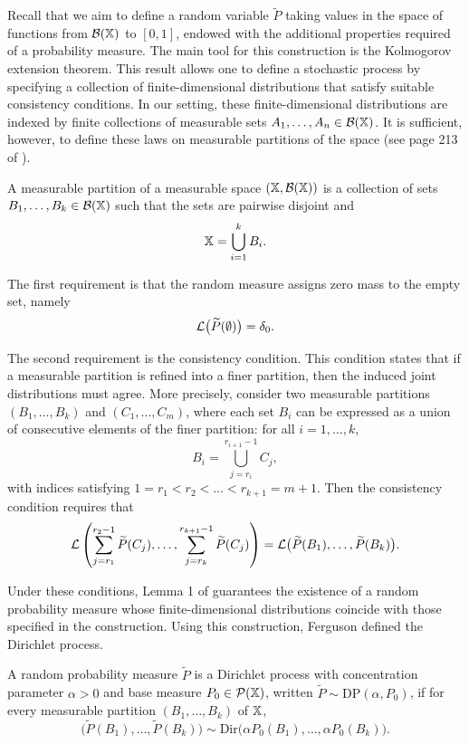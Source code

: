 Recall that we aim to define a random variable $\widetilde{P}$ taking values in the space of functions from $\mathcal{B}(\mathbb{X})$ to $[0,1]$, endowed with the additional properties required of a probability measure. The main tool for this construction is the Kolmogorov extension theorem. This result allows one to define a stochastic process by specifying a collection of finite-dimensional distributions that satisfy suitable consistency conditions. In our setting, these finite-dimensional distributions are indexed by finite collections of measurable sets $A_1, \dots, A_n \in \mathcal{B}(\mathbb{X})$. It is sufficient, however, to define these laws on measurable partitions of the space (see page 213 of \cite{ferguson1973bayesian}).

\begin{definition}\label{definition:measurable_partition}
A measurable partition of a measurable space $(\mathbb{X}, \mathcal{B}(\mathbb{X}))$ is a collection of sets $B_1, \dots, B_k \in \mathcal{B}(\mathbb{X})$ such that the sets are pairwise disjoint and
\[
\mathbb{X} = \bigcup_{i=1}^k B_i.
\]
\end{definition}

The first requirement is that the random measure assigns zero mass to the empty set, namely
\[
\mathcal{L}\bigl(\widetilde{P}(\emptyset)\bigr) = \delta_0.
\]

The second requirement is the consistency condition. This condition states that if a measurable partition is refined into a finer partition, then the induced joint distributions must agree. More precisely, consider two measurable partitions $(B_1, \dots, B_k)$ and $(C_1, \dots, C_m)$, where each set $B_i$ can be expressed as a union of consecutive elements of the finer partition: for all $i = 1,\dots, k,$
\[
B_i = \bigcup_{j=r_i}^{r_{i+1}-1} C_j,
\]
with indices satisfying $1 = r_1 < r_2 < \dots < r_{k+1} = m+1$. Then the consistency condition requires that
\[
\mathcal{L}\left(
\sum_{j=r_1}^{r_2-1} \widetilde{P}(C_j), \dots,
\sum_{j=r_k}^{r_{k+1}-1} \widetilde{P}(C_j)
\right)
=
\mathcal{L}\bigl(\widetilde{P}(B_1), \dots, \widetilde{P}(B_k)\bigr).
\]

Under these conditions, Lemma 1 of \cite{ferguson1973bayesian} guarantees the existence of a random probability measure whose finite-dimensional distributions coincide with those specified in the construction. Using this construction, Ferguson defined the Dirichlet process.
\begin{definition}\label{definition:dirichlet_process}
A random probability measure $\widetilde{P}$ is a Dirichlet process with concentration parameter $\alpha > 0$ and base measure $P_0 \in \mathcal{P}(\mathbb{X})$, written $\widetilde{P} \sim \mathrm{DP}(\alpha, P_0)$, if for every measurable partition $(B_1, \dots, B_k)$ of $\mathbb{X}$,
\[
\bigl(\widetilde{P}(B_1), \dots, \widetilde{P}(B_k)\bigr) \sim \mathrm{Dir}\bigl(\alpha P_0(B_1), \dots, \alpha P_0(B_k)\bigr).
\]
\end{definition}